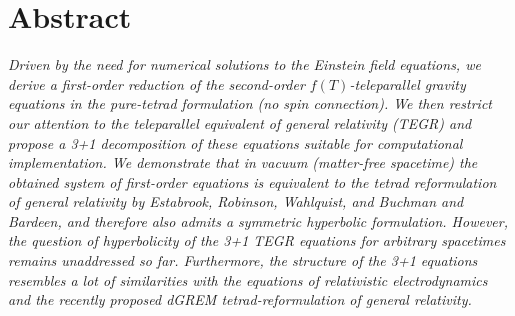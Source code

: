 \documentclass[
10pt, %
a4paper, %
oneside, %
twocolumn,
headinclude,footinclude, %
BCOR5mm, %
]{scrartcl}
\begin{document}
	\section*{Abstract} %
	\noindent
	\textit{
	Driven by the need for numerical solutions to the Einstein field equations,
	we derive a first-order reduction of the second-order $ f(T) $-teleparallel
	gravity equations in the pure-tetrad formulation (no spin connection).
	We then restrict our attention to the teleparallel equivalent of general
	relativity (TEGR) and propose a 3+1 decomposition of these equations
	suitable for computational implementation. We demonstrate that in vacuum 	(matter-free spacetime) the obtained system of first-order equations is
	equivalent to the tetrad reformulation of general relativity by Estabrook,
	Robinson, Wahlquist, and Buchman and Bardeen, and therefore also admits a
	symmetric hyperbolic formulation. However, the question of hyperbolicity of
	the 3+1 TEGR equations for arbitrary spacetimes remains unaddressed so far.
	Furthermore, the structure of the 3+1  equations resembles a lot of
	similarities with the equations of relativistic electrodynamics and the
	recently proposed dGREM tetrad-reformulation of general relativity.
	}
	\renewcommand{\thefootnote}{\arabic{footnote}}
	
\end{document}
